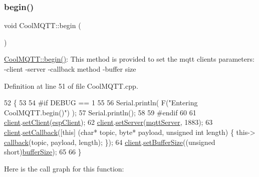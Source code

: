 \subsubsection{\texorpdfstring{begin()}{begin()}}
{\footnotesize\ttfamily void Cool\+M\+Q\+T\+T\+::begin (\begin{DoxyParamCaption}{ }\end{DoxyParamCaption})}

\hyperlink{class_cool_m_q_t_t_ac9248808641ebf3054ed0620ea9d0100}{Cool\+M\+Q\+T\+T\+::begin()}\+: This method is provided to set the mqtt client\textquotesingle{}s parameters\+: -\/client -\/server -\/callback method -\/buffer size 

Definition at line 51 of file Cool\+M\+Q\+T\+T.\+cpp.


\begin{DoxyCode}
52 \{ 
53 
54 \textcolor{preprocessor}{#if DEBUG == 1 }
55 
56     Serial.println( F(\textcolor{stringliteral}{"Entering CoolMQTT.begin()"}) );
57     Serial.println();
58 
59 \textcolor{preprocessor}{#endif}
60 
61     \hyperlink{class_cool_m_q_t_t_afed1372683c44893b4668d0f1771f514}{client}.\hyperlink{class_cool_pub_sub_client_a7ee119b786010561ab6a9afa0798e91d}{setClient}(\hyperlink{class_cool_m_q_t_t_acc30a0200967374a524092a8a806502a}{espClient});
62     \hyperlink{class_cool_m_q_t_t_afed1372683c44893b4668d0f1771f514}{client}.\hyperlink{class_cool_pub_sub_client_a947e70c394c66c7d08d0c53caf8425e3}{setServer}(\hyperlink{class_cool_m_q_t_t_ab8bb951f87ddbf92db74c2ad16a3e53e}{mqttServer}, 1883);    
63     \hyperlink{class_cool_m_q_t_t_afed1372683c44893b4668d0f1771f514}{client}.\hyperlink{class_cool_pub_sub_client_ac5cab7658f1bdded32131241e468e661}{setCallback}([\textcolor{keyword}{this}] (\textcolor{keywordtype}{char}* topic, byte* payload, \textcolor{keywordtype}{unsigned} \textcolor{keywordtype}{int} length) \{ this->
      \hyperlink{class_cool_m_q_t_t_a30d82ad665bfb603f46ecdbc290775df}{callback}(topic, payload, length); \});
64     \hyperlink{class_cool_m_q_t_t_afed1372683c44893b4668d0f1771f514}{client}.\hyperlink{class_cool_pub_sub_client_a4f83e54f1ba96e32f725d93cdec283b7}{setBufferSize}((\textcolor{keywordtype}{unsigned} \textcolor{keywordtype}{short})\hyperlink{class_cool_m_q_t_t_a7f3cf26b51d6770f216e42c5ef13ca9f}{bufferSize});
65 
66 \}
\end{DoxyCode}
Here is the call graph for this function\+:\nopagebreak
